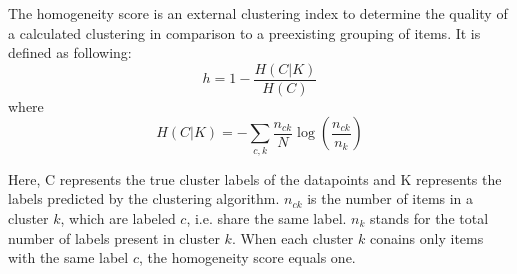 The homogeneity score is an external clustering index to determine the quality of a calculated clustering in comparison to a preexisting grouping of items.
It is defined as following:\\
$$h = 1 - \frac{H(C|K)}{H(C)}$$
where
$$H(C|K) = - \sum_{c,k} \frac{n_{ck}}{N}\log\left(\frac{n_{ck}}{n_k}\right)$$

Here, C represents the true cluster labels of the datapoints and K represents the labels predicted by the clustering algorithm. $n_{ck}$ is the number of items in a cluster $k$, which are labeled $c$, i.e. share the same label. $n_k$ stands for the total number of labels present in cluster $k$.
When each cluster $k$ conains only items with the same label $c$, the homogeneity score equals one.